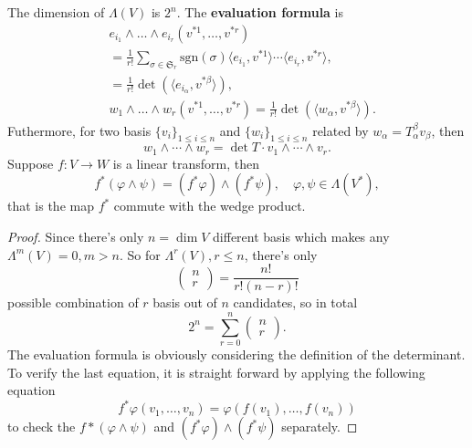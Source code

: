 \begin{theorem}
The dimension of $\Lambda(V)$ is $2^n$. The \textbf{evaluation formula} is 
\begin{equation}
\begin{aligned}
&e_{i_1}\wedge\dots\wedge e_{i_r}(v^{*1},\dots,v^{*r})\\
&=\frac{1}{r!}\sum_{\sigma\in\mathfrak{S}_r}\text{sgn}(\sigma)\langle e_{i_1},v^{*1}\rangle\cdots\langle e_{i_r},v^{*r}\rangle,\\
&=\frac{1}{r!}\det(\langle e_{i_\alpha},v^{*\beta}\rangle),\\
&w_{1}\wedge\dots\wedge w_{r}(v^{*1},\dots,v^{*r})=\frac{1}{r!}\det(\langle w_{\alpha},v^{*\beta}\rangle).
\end{aligned}
\end{equation}
Futhermore, for two basis $\{v_i\}_{1\le i\le n}$ and $\{w_i\}_{1\le i\le n}$ related by $w_\alpha=T^\beta_\alpha v_\beta$, then
\begin{equation}
w_1\wedge\cdots\wedge w_r= \det T\cdot v_1\wedge\cdots\wedge v_r.
\end{equation}
Suppose $f:V\to W$ is a linear transform, then
\begin{equation}
f^*(\varphi\wedge\psi)=(f^*\varphi)\wedge(f^*\psi),\quad \varphi,\psi\in \Lambda(V^*),
\end{equation}
that is the map $f^*$ commute with the wedge product.
\end{theorem}

\begin{proof}
Since there's only $n=\dim V$ different basis which makes any $\Lambda^{m}(V)=0,m>n$. So for $\Lambda^r(V),r\le n$, there's only
\begin{equation}
\left(
\begin{aligned}
n\\ r
\end{aligned}
\right)=\frac{n!}{r!(n-r)!}
\end{equation}
possible combination of $r$ basis out of $n$ candidates, so in total
\begin{equation}
2^n=\sum_{r=0}^n\left(
\begin{aligned}
n\\ r
\end{aligned}
\right).
\end{equation}
The evaluation formula is obviously considering the definition of the determinant. To verify the last equation, it is straight forward by applying the following equation
\begin{equation}
f^*\varphi(v_1,\dots,v_n)=\varphi(f(v_1),\dots,f(v_n))
\end{equation}
to check the $f*(\varphi\wedge\psi)$ and $(f^*\varphi)\wedge(f^*\psi)$ separately.
\end{proof}

